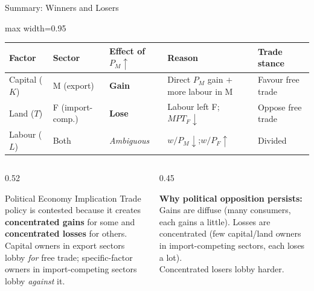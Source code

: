 \documentclass[aspectratio=169]{beamer}
\begin{document}
\begin{frame}{Summary: Winners and Losers}
\begin{center}
\begin{adjustbox}{max width=0.95\textwidth}
\begin{tabular}{lllll}
\toprule
\textbf{Factor} & \textbf{Sector} &
\textbf{Effect of $P_M\uparrow$} &
\textbf{Reason} &
\textbf{Trade stance}\\
\midrule
Capital ($K$) & M (export) &
\textcolor{AccentTeal}{\textbf{Gain}} &
Direct $P_M$ gain $+$ more labour in M &
Favour free trade\\
Land ($T$) & F (import-comp.) &
\textcolor{AccentRed}{\textbf{Lose}} &
Labour left F; $MPT_F\downarrow$ &
Oppose free trade\\
Labour ($L$) & Both &
\textit{Ambiguous} &
$w/P_M\downarrow$;\enspace $w/P_F\uparrow$ &
Divided\\
\bottomrule
\end{tabular}
\end{adjustbox}
\end{center}
\vspace{0.3em}
\begin{columns}[T]
\begin{column}{0.52\textwidth}
\begin{insight}{Political Economy Implication}
\small Trade policy is contested because it creates
\textbf{concentrated gains} for some and
\textbf{concentrated losses} for others.\\[0.2em]
Capital owners in export sectors lobby \emph{for}
free trade; specific-factor owners in import-competing
sectors lobby \emph{against} it.
\end{insight}
\end{column}
\begin{column}{0.45\textwidth}
\begin{varbox}
\footnotesize\textbf{Why political opposition persists:}\\[0.2em]
Gains are diffuse (many consumers, each gains a
little).  Losses are concentrated (few capital/land
owners in import-competing sectors, each loses a lot).\\[0.1em]
Concentrated losers lobby harder.
\end{varbox}
\end{column}
\end{columns}
\end{frame}
\end{document}
